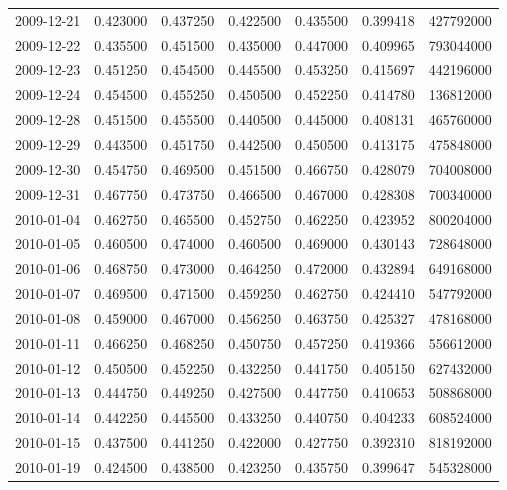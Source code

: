 \begin{tabular}{lrrrrrr}
2009-12-21 &    0.423000 &    0.437250 &    0.422500 &    0.435500 &    0.399418 &   427792000 \\
2009-12-22 &    0.435500 &    0.451500 &    0.435000 &    0.447000 &    0.409965 &   793044000 \\
2009-12-23 &    0.451250 &    0.454500 &    0.445500 &    0.453250 &    0.415697 &   442196000 \\
2009-12-24 &    0.454500 &    0.455250 &    0.450500 &    0.452250 &    0.414780 &   136812000 \\
2009-12-28 &    0.451500 &    0.455500 &    0.440500 &    0.445000 &    0.408131 &   465760000 \\
2009-12-29 &    0.443500 &    0.451750 &    0.442500 &    0.450500 &    0.413175 &   475848000 \\
2009-12-30 &    0.454750 &    0.469500 &    0.451500 &    0.466750 &    0.428079 &   704008000 \\
2009-12-31 &    0.467750 &    0.473750 &    0.466500 &    0.467000 &    0.428308 &   700340000 \\
2010-01-04 &    0.462750 &    0.465500 &    0.452750 &    0.462250 &    0.423952 &   800204000 \\
2010-01-05 &    0.460500 &    0.474000 &    0.460500 &    0.469000 &    0.430143 &   728648000 \\
2010-01-06 &    0.468750 &    0.473000 &    0.464250 &    0.472000 &    0.432894 &   649168000 \\
2010-01-07 &    0.469500 &    0.471500 &    0.459250 &    0.462750 &    0.424410 &   547792000 \\
2010-01-08 &    0.459000 &    0.467000 &    0.456250 &    0.463750 &    0.425327 &   478168000 \\
2010-01-11 &    0.466250 &    0.468250 &    0.450750 &    0.457250 &    0.419366 &   556612000 \\
2010-01-12 &    0.450500 &    0.452250 &    0.432250 &    0.441750 &    0.405150 &   627432000 \\
2010-01-13 &    0.444750 &    0.449250 &    0.427500 &    0.447750 &    0.410653 &   508868000 \\
2010-01-14 &    0.442250 &    0.445500 &    0.433250 &    0.440750 &    0.404233 &   608524000 \\
2010-01-15 &    0.437500 &    0.441250 &    0.422000 &    0.427750 &    0.392310 &   818192000 \\
2010-01-19 &    0.424500 &    0.438500 &    0.423250 &    0.435750 &    0.399647 &   545328000 \\

\end{tabular}
